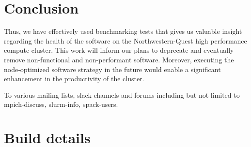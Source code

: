 \documentclass[sigconf,authordraft]{acmart}
\begin{document}
\section{Conclusion}

Thus, we have effectively used benchmarking tests that gives us valuable insight regarding the health of the software on the Northwestern-Quest high performance compute cluster. This work will inform our plans to deprecate and eventually remove non-functional and non-performant software. Moreover, executing the node-optimized software strategy in the future would enable a significant enhancement in the productivity of the cluster.

\begin{acks}
To various mailing lists, slack channels and forums including but not limited to mpich-discuss, slurm-info, spack-users.
\end{acks}




\appendix
\section{Build details}
\end{document}
